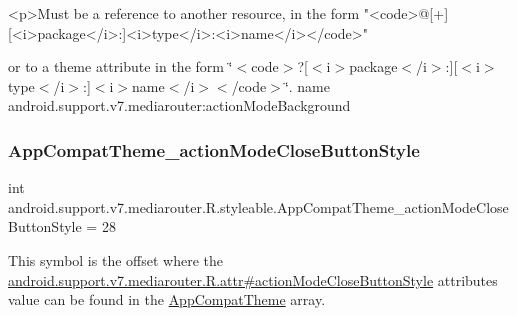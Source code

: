\begin{DoxyVerb}      <p>Must be a reference to another resource, in the form "<code>@[+][<i>package</i>:]<i>type</i>:<i>name</i></code>"
\end{DoxyVerb}
 or to a theme attribute in the form \char`\"{}$<$code$>$?\mbox{[}$<$i$>$package$<$/i$>$\+:\mbox{]}\mbox{[}$<$i$>$type$<$/i$>$\+:\mbox{]}$<$i$>$name$<$/i$>$$<$/code$>$\char`\"{}.  name android.\+support.\+v7.\+mediarouter\+:action\+Mode\+Background \mbox{\label{classandroid_1_1support_1_1v7_1_1mediarouter_1_1R_1_1styleable_ae913f582e350a5afee1675a4e71926f6}} 
\subsubsection{\texorpdfstring{App\+Compat\+Theme\+\_\+action\+Mode\+Close\+Button\+Style}{AppCompatTheme\_actionModeCloseButtonStyle}}
{\footnotesize\ttfamily int android.\+support.\+v7.\+mediarouter.\+R.\+styleable.\+App\+Compat\+Theme\+\_\+action\+Mode\+Close\+Button\+Style = 28\hspace{0.3cm}{\ttfamily [static]}}

This symbol is the offset where the \hyperlink{classandroid_1_1support_1_1v7_1_1mediarouter_1_1R_1_1attr_ae5c102ae0e21969b71b59eb62c149cb2}{android.\+support.\+v7.\+mediarouter.\+R.\+attr\#action\+Mode\+Close\+Button\+Style} attribute\textquotesingle{}s value can be found in the \hyperlink{classandroid_1_1support_1_1v7_1_1mediarouter_1_1R_1_1styleable_a4e3d3900c75d49aeb2f283cac00214d6}{App\+Compat\+Theme} array.

